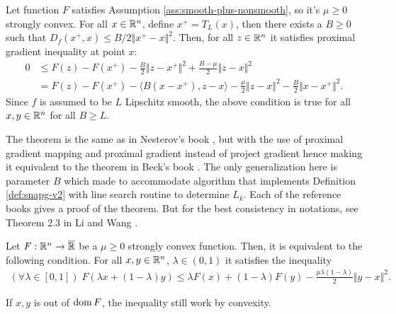 \documentclass[12pt]{article}
\begin{document}
        \begin{theorem}\label{thm:pg-ineq}
            Let function $F$ satisfies Assumption \ref{ass:smooth-plus-nonsmooth}, so it's $\mu \ge 0$ strongly convex. 
            For all $x\in \mathbb R^n$, define $x^+ = T_L(x)$, then there exists a $B \ge 0$ such that $D_f(x^+, x) \le B/2 \Vert x^+ - x\Vert^2$. 
            Then, for all $z \in \mathbb R^n$ it satisfies proximal gradient inequality at point $x$:  
            \begin{align*}
                0&\le F(z) - F(x^+) - \frac{B}{2}\Vert z - x^+\Vert^2  + \frac{B - \mu}{2}\Vert z - x\Vert^2
                \\
                &=  F(z) - F(x^+) - \langle B(x - x^+), z - x\rangle
                - \frac{\mu}{2}\Vert z - x\Vert^2
                - \frac{B}{2}\Vert x - x^+\Vert^2. 
            \end{align*}
            Since $f$ is assumed to be $L$ Lipschitz smooth, the above condition is true for all $x, y \in \mathbb R^n$ for all $B \ge L$. 
        \end{theorem}
        \begin{remark}
            The theorem is the same as in Nesterov's book \cite[Theorem 2.2.13]{nesterov_lectures_2018}, but with the use of proximal gradient mapping and proximal gradient instead of project gradient hence making it equivalent to the theorem in Beck's book \cite[Theorem 10.16]{beck_first-order_2017}. 
            The only generalization here is parameter $B$ which made to accommodate algorithm that implements Definition \ref{def:snapg-v2} with line search routine to determine $L_k$. 
            Each of the reference books gives a proof of the theorem. 
            But for the best consistency in notations, see Theorem 2.3 in Li and Wang \cite{li_relaxed_2025}. 
        \end{remark}
        \begin{theorem}\label{thm:jesen}
            Let $F: \mathbb R^n \rightarrow \overline {\mathbb R}$ be a $\mu \ge 0$ strongly convex function. 
            Then, it is equivalent to the following condition. 
            For all $x, y \in \mathbb R^n$, $\lambda \in (0, 1)$ it satisfies the inequality 
            \begin{align*}
                (\forall \lambda \in [0, 1])\; 
                F(\lambda x + (1 - \lambda)y) \le \lambda F(x) + (1 - \lambda)F(y) -\frac{\mu\lambda(1 - \lambda)}{2} \Vert y - x\Vert^2. 
            \end{align*}
        \end{theorem}
        \begin{remark}
            If $x, y$ is out of $\operatorname{dom} F$, the inequality still work by convexity. 
        \end{remark}
    
\end{document}
